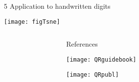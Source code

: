 \begin{frame}
\begin{columns}
\begin{column}{0.99\textwidth}
\begin{columns}[t]
\begin{column}{0.32\textwidth}
\begin{block}{\large 5 Application to handwritten digits}
\begin{adjustwidth}{1.cm}{1.cm}
					\end{adjustwidth}
					\thirdBlockImSpace
					\begin{center}
						\texttt{[image: figTsne]}
					\end{center}

					
					\blockSpaceTwo
					\end{block}


					\interBlockSpaceTwo




				\end{column}

				\begin{column}{.005\textwidth}\end{column}


			\end{columns}



		\end{column}
		\begin{column}{.005\textwidth}\end{column}
	\end{columns}

	\vspace{0cm}

	\begin{columns}[t]
		\begin{column}{.01\textwidth}\end{column}

		\begin{column}{.98\textwidth}
			\begin{block}{References}
			 \begin{minipage}{0.79\linewidth}
								\tiny
								
								
			 \end{minipage}
			 \begin{minipage}{.09\linewidth}
				\texttt{[image: QRguidebook]}
			 \end{minipage}
			 \begin{minipage}{.09\linewidth}
				\texttt{[image: QRpubl]}
			 \end{minipage}

			\end{block}
		\end{column}

		\begin{column}{.01\textwidth}\end{column}
	\end{columns}

\end{frame} %
